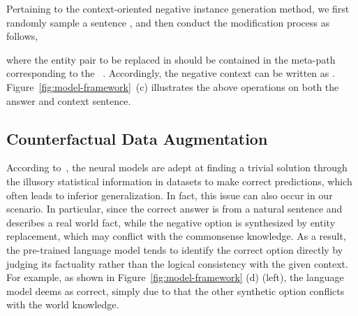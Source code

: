 Pertaining to the context-oriented negative instance generation method, we first 
randomly sample a sentence , and then conduct the modification process as follows,

where the entity pair to be replaced in  should be contained in the meta-path corresponding to the \ntgtentp~.
Accordingly, the negative context can be written as .
Figure~\ref{fig:model-framework}~(c) illustrates the above operations on both the answer and context sentence.


















\subsection{Counterfactual Data Augmentation}
\label{sec:method:counterfactual}

According to~\citet{position-bias-2020-ko,sigir-bias,shortcut-mrc-2021-lai,tip-bias}, the neural models are adept at finding a trivial solution through the illusory statistical information in datasets to make correct predictions,
which often leads to inferior generalization.
In fact, this issue can also occur in our scenario.
In particular, since the correct answer is from a natural sentence and describes a real world fact, while the negative option is synthesized by entity replacement, which may conflict with the commonsense knowledge.
As a result, the pre-trained language model tends to identify the correct option directly by judging its factuality rather than the logical consistency with the given context.
For example, as shown in Figure~\ref{fig:model-framework} (d) (left), 
the language model deems  as correct, simply due to that the other synthetic option  conflicts with the world knowledge.


